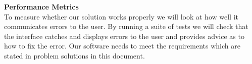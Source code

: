 \documentclass[a4paper,10pt]{IEEETran}
\begin{document}
	\noindent \textbf{Performance Metrics}\\
	\indent To measure whether our solution works properly we will look at how well it communicates errors to the user.
	 By running a suite of tests we will check that the interface catches and displays errors to the user and provides advice as to how to fix the error.
	 Our software needs to meet the requirements which are stated in problem solutions in this document.
	 
\end{document}
